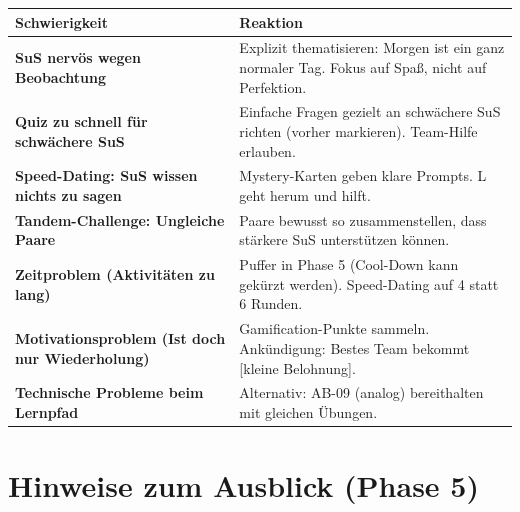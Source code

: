 \documentclass[11pt,a4paper]{article}
\begin{document}
\begin{tabular}{|p{4.5cm}|p{8.5cm}|}
\hline
\textbf{Schwierigkeit} & \textbf{Reaktion} \\
\hline
\textbf{SuS nervös wegen Beobachtung} & Explizit thematisieren: \glqq{}Morgen ist ein ganz normaler Tag.\grqq{} Fokus auf Spaß, nicht auf Perfektion. \\
\hline
\textbf{Quiz zu schnell für schwächere SuS} & Einfache Fragen gezielt an schwächere SuS richten (vorher markieren). Team-Hilfe erlauben. \\
\hline
\textbf{Speed-Dating: SuS wissen nichts zu sagen} & Mystery-Karten geben klare Prompts. L geht herum und hilft. \\
\hline
\textbf{Tandem-Challenge: Ungleiche Paare} & Paare bewusst so zusammenstellen, dass stärkere SuS unterstützen können. \\
\hline
\textbf{Zeitproblem (Aktivitäten zu lang)} & Puffer in Phase 5 (Cool-Down kann gekürzt werden). Speed-Dating auf 4 statt 6 Runden. \\
\hline
\textbf{Motivationsproblem (\glqq{}Ist doch nur Wiederholung\grqq{})} & Gamification-Punkte sammeln. Ankündigung: \glqq{}Bestes Team bekommt [kleine Belohnung].\grqq{} \\
\hline
\textbf{Technische Probleme beim Lernpfad} & Alternativ: AB-09 (analog) bereithalten mit gleichen Übungen. \\
\hline
\end{tabular}

\section{Hinweise zum Ausblick (Phase 5)}
\end{document}
